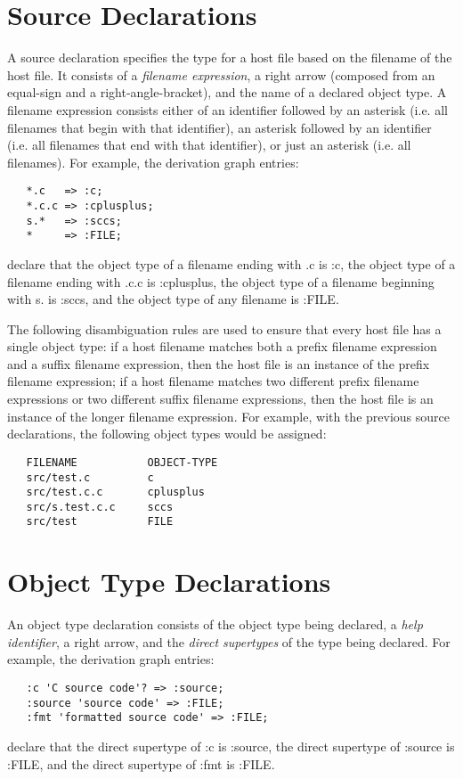 \section{Source Declarations}
\label{sourcedecl}

A source declaration specifies the type for a host file
based on the filename of the host file.
It consists of a {\em filename expression},
a right arrow (composed from an equal-sign and a right-angle-bracket),
and the name of a declared object type.
A filename expression consists either of an identifier followed by an asterisk
(i.e. all filenames that begin with that identifier),
an asterisk followed by an identifier
(i.e. all filenames that end with that identifier),
or just an asterisk (i.e. all filenames).
For example, the derivation graph entries:
\begin{verbatim}
   *.c   => :c;
   *.c.c => :cplusplus;
   s.*   => :sccs;
   *     => :FILE;
\end{verbatim}
declare that the object type of a filename ending with {\ex .c} is {\ex :c},
the object type of a filename ending with {\ex .c.c} is {\ex :cplusplus},
the object type of a filename beginning with {\ex s.} is {\ex :sccs},
and the object type of any filename is {\ex :FILE}.

The following disambiguation rules are used to ensure
that every host file has a single object type:
if a host filename matches both a prefix filename expression
and a suffix filename expression, then the host file is an instance
of the prefix filename expression;
if a host filename matches two different prefix filename expressions
or two different suffix filename expressions,
then the host file is an instance of the longer filename expression.
For example, with the previous source declarations,
the following object types would be assigned:
\begin{verbatim}
   FILENAME           OBJECT-TYPE
   src/test.c         c
   src/test.c.c       cplusplus
   src/s.test.c.c     sccs
   src/test           FILE
\end{verbatim}


\section{Object Type Declarations}
\label{objecttype}

An object type declaration consists of
the object type being declared,
a {\em help identifier},
a right arrow, and the {\em direct supertypes} of the type being declared.
For example, the derivation graph entries:
\begin{verbatim}
   :c 'C source code'? => :source;
   :source 'source code' => :FILE;
   :fmt 'formatted source code' => :FILE;
\end{verbatim}
declare that
the direct supertype of {\ex :c} is {\ex :source},
the direct supertype of {\ex :source} is {\ex :FILE}, and
the direct supertype of {\ex :fmt} is {\ex :FILE}.

